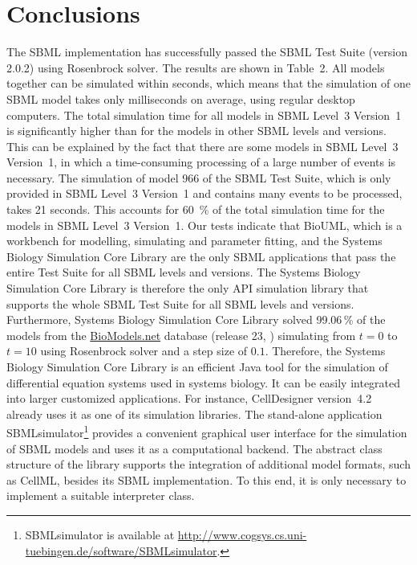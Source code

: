 \documentclass[10pt]{bmc_article}
\newenvironment{bmcformat}{\baselineskip20pt\sloppy\setboolean{publ}{false}}{\baselineskip20pt\sloppy}
\begin{document}
\begin{bmcformat}
\section*{Conclusions}
The SBML implementation has successfully passed the
SBML Test Suite (version 2.0.2) using Rosenbrock solver.
The results are shown in Table~2.
All models together can be simulated within seconds, which means that the simulation
of one SBML model takes only milliseconds on average, using regular desktop computers.
The total simulation time for all models in SBML Level~3 Version~1 is significantly
higher than for the models in other SBML levels and versions.
This can be explained by the fact that there are some models in SBML Level~3 Version~1,
in which a time-consuming processing of a large number of events is necessary.
The simulation of model 966 of the SBML Test Suite, which is only provided in
SBML Level~3 Version~1 and contains many events to be processed, takes 21 seconds.
This accounts for 60~\% of the total simulation time for the models in SBML
Level~3 Version~1. 
Our tests indicate that BioUML, which is a workbench for modelling, simulating
and parameter fitting, and the Systems Biology Simulation Core Library are the
only SBML applications that pass the entire Test Suite for all SBML levels and
versions.
The Systems Biology Simulation Core Library is therefore the only API simulation
library that supports the whole SBML Test Suite for all SBML levels and versions.
Furthermore, Systems Biology Simulation Core Library solved 99.06\,\% of the
models from the
\href{http://biomodels.net}{BioModels.net} database (release 23,
\cite{Novere2006a}) simulating from $t = 0$ to $t = 10$ using Rosenbrock solver
and a step size of $0.1$.
Therefore, the Systems Biology Simulation Core Library is an efficient Java tool
for the
simulation of differential equation systems used in systems biology. It can be
easily integrated into larger customized applications.
For instance, CellDesigner version~4.2 \cite{Funahashi2003} already uses it as
one of its simulation libraries.
The stand-alone application SBMLsimulator\footnote{SBMLsimulator is available at
\url{http://www.cogsys.cs.uni-tuebingen.de/software/SBMLsimulator}.}
provides a convenient graphical user interface for the simulation of SBML
models and uses it as a computational backend.
The abstract class structure of the library supports the integration of
additional model formats, such as CellML, besides its SBML implementation. To
this end, it is only necessary to implement a suitable interpreter class.


\end{bmcformat}
\end{document}
